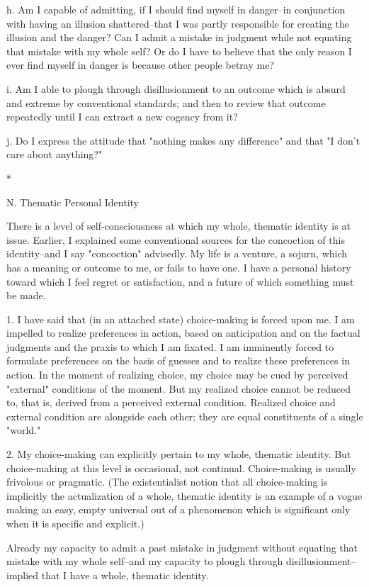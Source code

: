 h. Am I capable of admitting, if I should find myself in danger--in conjunction with having an illusion shattered--that I was partly responsible for creating the illusion and the danger? Can I admit a mistake in judgment while not equating that mistake with my whole self? Or do I have to believe that the only reason I ever find myself in danger is because other people betray me?

i. Am I able to plough through disillusionment to an outcome which is absurd and extreme by conventional standards; and then to review that outcome repeatedly until I can extract a new cogency from it?

j. Do I express the attitude that "nothing makes any difference" and that "I don't care about anything?"

*

N. Thematic Personal Identity

There is a level of self-consciousness at which my whole, thematic identity is at issue. Earlier, I explained some conventional sources for the concoction of this identity--and I say "concoction" advisedly. My life is a venture, a sojurn, which has a meaning or outcome to me, or fails to have one. I have a personal history toward which I feel regret or satisfaction, and a future of which something must be made.

1. I have said that (in an attached state) choice-making is forced upon me. I am impelled to realize preferences in action, based on anticipation and on the factual judgments and the praxis to which I am fixated. I am imminently forced to formulate preferences on the basis of guesses and to realize these preferences in action. In the moment of realizing choice, my choice may be cued by perceived "external" conditions of the moment. But my realized choice cannot be reduced to, that is, derived from a perceived external condition. Realized choice and external condition are alongside each other; they are equal constituents of a single "world."

2. My choice-making can explicitly pertain to my whole, thematic identity. But choice-making at this level is occasional, not continual. Choice-making is usually frivolous or pragmatic. (The existentialist notion that all choice-making is implicitly the actualization of a whole, thematic identity is an example of a vogue making an easy, empty universal out of a phenomenon which is significant only when it is specific and explicit.)

Already my capacity to admit a past mistake in judgment without equating that mistake with my whole self--and my capacity to plough through disillusionment--implied that I have a whole, thematic identity.

